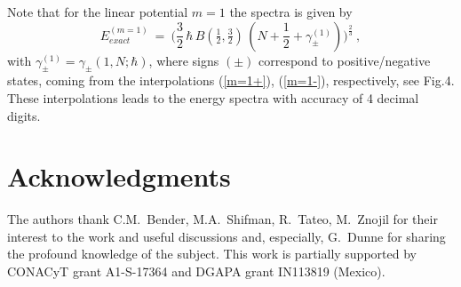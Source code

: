\documentclass[preprint,preprintnumbers,amsmath,amssymb]{revtex4}
\begin{document}
Note that for the linear potential $m=1$ the spectra is given by
\begin{equation}
\label{m=1exact}
		E^{(m=1)}_{exact}\ =\
           \bigg(\frac{3}{2}\,{\hbar}\,B\left(\tfrac{1}{2},\tfrac{3}{2}\right)\,
		\left( N+\frac{1}{2}+\gamma^{(1)}_{\pm} \right)\bigg)^{\frac{2}{3}}\ ,
\end{equation}
with $\gamma^{(1)}_{\pm}=\gamma_{\pm}(1,N;\hbar)$, where signs $(\pm)$ correspond to positive/negative states, coming from the interpolations (\ref{m=1+}), (\ref{m=1-}), respectively, see Fig.4. These interpolations leads to the energy spectra with accuracy of 4 decimal digits. 



\vspace{-5mm}
\section*{Acknowledgments}
\vspace{-3mm}

The authors thank C.M.~Bender, M.A.~Shifman, R.~Tateo, M.~Znojil for their interest to the work and useful discussions and, especially, G.~Dunne for sharing the profound knowledge of the subject.
This work is partially supported by CONACyT grant A1-S-17364 and DGAPA grant IN113819 (Mexico).
\end{document}
